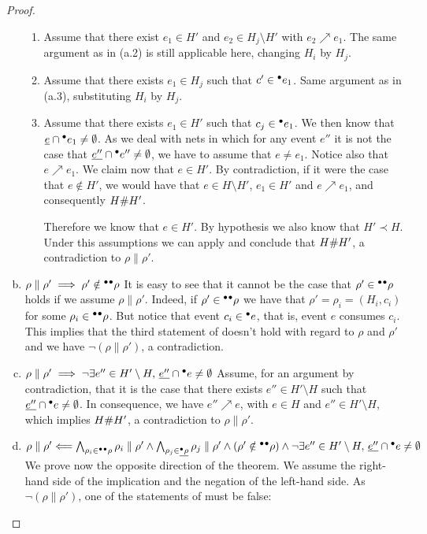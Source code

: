 \begin{proof}
\begin{enumerate}[(a)]
\begin{enumerate}[1.]
\item Assume that there exist $e_1 \in H'$ and $e_2 \in H_j \setminus H'$ with
$e_2 \nearrow e_1$.  The same argument as in (a.2) is still applicable here,
changing $H_i$ by $H_j$.

\item Assume that there exists $e_1 \in H_j$ such that $c' \in {}^\bullet e_1$.
Same argument as in (a.3), substituting $H_i$ by $H_j$.

\item Assume that there exists $e_1 \in H'$ such that $c_j \in {}^\bullet e_1$.  We
then know that $\underline{e} \cap {}^\bullet e_1 \ne \emptyset$.  As we deal with nets
in which for any event $e''$ it is not the case that $\underline{e''} \cap {}^\bullet e''
\not= \emptyset$, we have to assume that $e \not= e_1$.  Notice also that $e
\nearrow e_1$.  We claim now that $e \in H'$.  By contradiction, if it were the
case that $e \notin H'$, we would have that $e \in H \setminus H'$, $e_1 \in
H'$ and $e \nearrow e_1$, and consequently $H \mathord{\#} H'$.

Therefore we know that $e \in H'$.  By hypothesis we also know that $H' \prec
H$.  Under this assumptions we can apply  and conclude that
$H \mathord{\#} H'$, a contradiction to $\rho \parallel \rho'$.
\end{enumerate}

\item $\rho \parallel \rho' \implies \rho' \notin {}^\bullet{}^\bullet\rho$  It is easy
to see that it cannot be the case that $\rho' \in {}^\bullet{}^\bullet\rho$ holds if we
assume $\rho \parallel \rho'$.  Indeed, if $\rho' \in {}^\bullet{}^\bullet\rho$ we have
that $\rho' = \rho_i = (H_i, c_i)$ for some $\rho_i \in {}^\bullet{}^\bullet\rho$.  But
notice that event $c_i \in {}^\bullet e$, that is, event $e$ consumes $c_i$.  This
implies that the third statement of  doesn't hold with
regard to $\rho$ and $\rho'$ and we have $\lnot (\rho \parallel \rho')$, a
contradiction.

\item $\rho \parallel \rho' \implies \lnot \exists e'' \in H' \setminus
H,\, \underline{e''} \cap {}^\bullet e \not= \emptyset$  Assume, for an argument by
contradiction, that it is the case that there exists $e'' \in H' \setminus H$
such that $\underline{e''} \cap {}^\bullet e \not= \emptyset$.  In consequence, we have
$e'' \nearrow e$, with $e \in H$ and $e'' \in H' \setminus H$, which implies $H
\mathord{\#} H'$, a contradiction to $\rho \parallel \rho'$.

\item $\rho \parallel \rho' \Longleftarrow \bigwedge_{\rho_i \in {}^\bullet{}^\bullet\rho} \rho_i \parallel \rho' \land \bigwedge_{\rho_j \in \underline{{}^\bullet\rho}}
\rho_j \parallel \rho' \land (\rho' \notin {}^\bullet{}^\bullet\rho) \land \lnot \exists
e'' \in H' \setminus H,\, \underline{e''} \cap {}^\bullet e \not= \emptyset$  We prove now
the opposite direction of the theorem.  We assume the right-hand side of the
implication and the negation of the left-hand side.  As $\lnot (\rho \parallel
\rho')$, one of the statements of  must be false:


\end{enumerate}
\end{proof}

